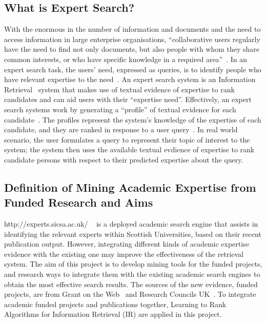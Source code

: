 \subsection{What is Expert Search?}\label{sec:expertsearch}
With the enormous in the number of information and documents and the need to access information in large enterprise organisations,
``collaborative users regularly have the need to find not only documents, but also people with whom they share common interests, 
or who have specific knowledge in a required area''~\cite[P. 388]{expertsearch}. In an expert search task,
the users' need, expressed as queries, is to identify people who have relevant expertise to the need~\cite[P. 387]{expertsearch}.
An expert search system is an Information Retrieval~\cite{IR} system that makes use of textual evidence 
of expertise to rank candidates and can aid users with their ``expertise need''. Effectively, an expert search systems work by generating a ``profile'' 
of textual evidence for each candidate~\cite[P. 388]{expertsearch}. The profiles represent the system's knowledge of the expertise of each 
candidate, and they are ranked in response to a user query~\cite[P. 388]{expertsearch}. In real world scenario, the user formulates a query to 
represent their topic of interest to the system; the system then uses the available textual evdience of expertise to rank candidate persons with 
respect to their predicted expertise about the query.

\subsection{Definition of Mining Academic Expertise from Funded Research and Aims}\label{section:aims}
http://experts.sicsa.ac.uk/ ~\cite{sicsasearch} is a deployed academic search engine that assists in identifying the relevant experts within Scottish Universities, 
based on their recent publication output. However, integrating different kinds of academic expertise evidence with the existing one may improve
the effectiveness of the retrieval system. The aim of this project is to develop mining tools for the funded projects, 
and research ways to integrate them with the existing academic search engines to obtain the most effective search results. 
The sources of the new evidence, funded projects, are from Grant on the Web~\cite{gow} and Research Councils UK~\cite{gtr}.
To integrate academic funded projects and publications together, Learning to Rank Algorithms for Information Retrieval (IR) are applied in this project.

